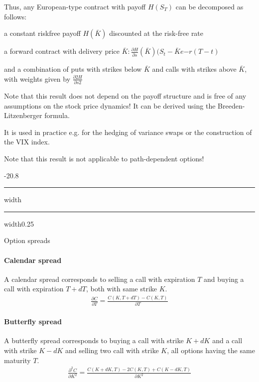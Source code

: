 \documentclass[a4paper,landscape,7pt,fleqn]{scrartcl}
\makeatletter
\renewcommand{\subsection}{\@startsection{subsection}{1}{0mm}%
{-2\baselineskip}{0.8\baselineskip}%
{\hrule depth 0.2pt width\columnwidth\hrule depth0.75pt
width0.25\columnwidth\vspace*{1.2em}\large\bfseries}}
\makeatother
\begin{document}
\begin{multicols*}{3}
Thus, any European-type contract with payoff $H(S_T)$ can be decomposed as follows:
\begin{description}[style=multiline,leftmargin=0.4cm,font=\textbf]
\item[I]  a constant riskfree payoff $H(\bar K)$ discounted at the risk-free rate
\item[II] a forward contract with delivery price $\bar K: \frac{\partial H}{\partial s}(\bar K) (S_t - \bar K e{-r (T-t)}$
\item[III] and a combination of puts with strikes below $\bar K$ and calls with strikes above $\bar K$, with weights given by $\frac{\partial2 H}{\partial s2}$
\end{description}

Note that this result does not depend on the payoff structure and is free of any assumptions on the stock price dynamics! It can be derived using the Breeden-Litzenberger formula.

It is used in practice e.g. for the hedging of variance swaps or the construction of the VIX index.

Note that this result is not applicable to path-dependent options!

\subsection{Option spreads}

\paragraph{Calendar spread}
A calendar spread corresponds to selling a call with expiration $T$ and buying a call with expiration $T+dT$, both with same strike $K$.
\begin{align*}
\frac{\partial C}{\partial T} = \frac{C(K,T+dT) - C(K,T)}{\partial T}
\end{align*}

\paragraph{Butterfly spread}
A butterfly spread corresponds to buying a call with strike $K+dK$ and a call with strike $K-dK$ and selling two call with strike $K$, all options having the same maturity $T$.
\begin{align*}
\frac{\partial^2 C}{\partial K^2} = \frac{C(K+dK,T) - 2 C(K,T) + C(K-dK,T)}{\partial K^2}
\end{align*}


\end{multicols*}
\end{document}
